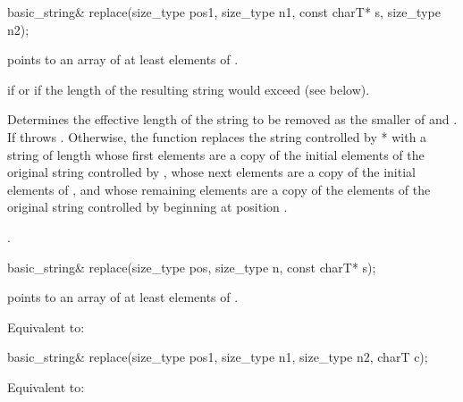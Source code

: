 %
\begin{itemdecl}
basic_string& replace(size_type pos1, size_type n1, const charT* s, size_type n2);
\end{itemdecl}

\begin{itemdescr}
\pnum
\requires {} points to an array of at
least  elements of .

\pnum
\throws {} if  or 
if the length of the resulting string would exceed  (see below).

\pnum
\effects Determines the effective length  of the string to be
removed as the smaller of  and . If
 throws . Otherwise,
the function replaces the string controlled by * with a string of
length  whose first  elements are a copy
of the initial elements of the original string controlled by ,
whose next  elements are a copy of the initial  elements
of , and whose remaining elements are a copy of the elements of the
original string controlled by  beginning at position
.

\pnum
\returns
{}.
\end{itemdescr}

%
\begin{itemdecl}
basic_string& replace(size_type pos, size_type n, const charT* s);
\end{itemdecl}

\begin{itemdescr}
\pnum
\requires {} points to an array of at least
 elements of .

\pnum
\effects Equivalent to: 
\end{itemdescr}

%
\begin{itemdecl}
basic_string& replace(size_type pos1, size_type n1, size_type n2, charT c);
\end{itemdecl}

\begin{itemdescr}
\pnum
\effects Equivalent to: 
\end{itemdescr}

